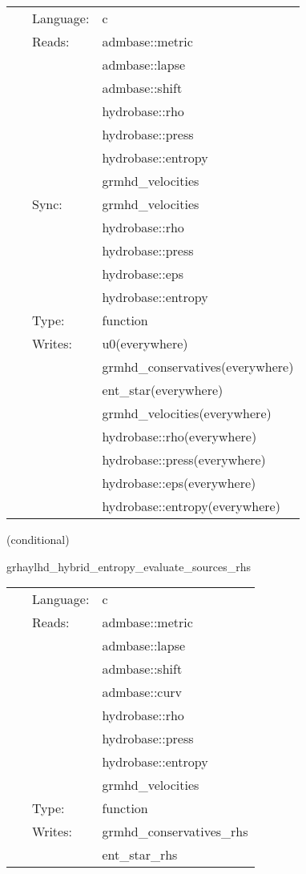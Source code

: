 \hspace{5mm}

 \begin{tabular*}{160mm}{cll} 
~ & Language:  & c \\ 
~ & Reads:  & admbase::metric \\ 
~& ~ &admbase::lapse\\ 
~& ~ &admbase::shift\\ 
~& ~ &hydrobase::rho\\ 
~& ~ &hydrobase::press\\ 
~& ~ &hydrobase::entropy\\ 
~& ~ &grmhd\_velocities\\ 
~ & Sync:  & grmhd\_velocities \\ 
~& ~ &hydrobase::rho\\ 
~& ~ &hydrobase::press\\ 
~& ~ &hydrobase::eps\\ 
~& ~ &hydrobase::entropy\\ 
~ & Type:  & function \\ 
~ & Writes:  & u0(everywhere) \\ 
~& ~ &grmhd\_conservatives(everywhere)\\ 
~& ~ &ent\_star(everywhere)\\ 
~& ~ &grmhd\_velocities(everywhere)\\ 
~& ~ &hydrobase::rho(everywhere)\\ 
~& ~ &hydrobase::press(everywhere)\\ 
~& ~ &hydrobase::eps(everywhere)\\ 
~& ~ &hydrobase::entropy(everywhere)\\ 
\end{tabular*} 


\vspace{5mm}

   (conditional) 

\hspace{5mm} grhaylhd\_hybrid\_entropy\_evaluate\_sources\_rhs 

\hspace{5mm}{\it entropy+hybrid version of grhaylhd\_evaluate\_sources\_rhs } 


\hspace{5mm}

 \begin{tabular*}{160mm}{cll} 
~ & Language:  & c \\ 
~ & Reads:  & admbase::metric \\ 
~& ~ &admbase::lapse\\ 
~& ~ &admbase::shift\\ 
~& ~ &admbase::curv\\ 
~& ~ &hydrobase::rho\\ 
~& ~ &hydrobase::press\\ 
~& ~ &hydrobase::entropy\\ 
~& ~ &grmhd\_velocities\\ 
~ & Type:  & function \\ 
~ & Writes:  & grmhd\_conservatives\_rhs \\ 
~& ~ &ent\_star\_rhs\\ 
\end{tabular*} 


